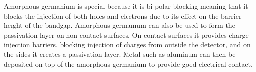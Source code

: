 Amorphous germanium is special because it is bi-polar blocking meaning that it blocks the injection of both holes and electrons due to its effect on the barrier height of the bandgap.
Amorphous germanium can also be used to form the passivation layer on non contact surfaces.
On contact surfaces it provides charge injection barriers, blocking injection of charges from outside the detector, and on the sides it creates a passivation layer. 
Metal such as aluminum can then be deposited on top of the amorphous germanium to provide good electrical contact.

